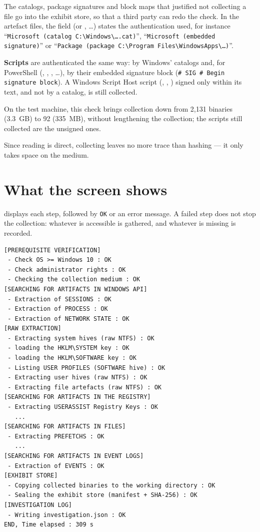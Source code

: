 \documentclass[11pt,a4paper,oneside]{report}
\begin{document}
The catalogs, package signatures and block maps that justified not collecting a
file go into the exhibit store, so that a third party can redo the check. In
the artefact files, the  field (or ,
\ldots) states the authentication used, for instance
``\texttt{Microsoft (catalog C:\textbackslash{}Windows\textbackslash{}\ldots.cat)}'',
``\texttt{Microsoft (embedded signature)}'' or
``\texttt{Package (package C:\textbackslash{}Program Files\textbackslash{}WindowsApps\textbackslash{}\ldots)}''.

\textbf{Scripts} are authenticated the same way: by Windows' catalogs and, for
PowerShell (, , ,
\ldots), by their embedded signature block
(\texttt{\# SIG \# Begin signature block}). A Windows Script Host script
(, , ) signed only within its text, and
not by a catalog, is still collected.

On the test machine, this check brings collection down from 2,131 binaries
(3.3~GB) to 92 (335~MB), without lengthening the collection; the scripts still
collected are the unsigned ones.

Since reading is direct, collecting leaves no more trace than hashing — it only
takes space on the medium.

\section{What the screen shows}

\wac{} displays each step, followed by \texttt{OK} or an error message. A failed
step does not stop the collection: whatever is accessible is gathered, and
whatever is missing is recorded.

\begin{lstlisting}
[PREREQUISITE VERIFICATION]
 - Check OS >= Windows 10 : OK
 - Check administrator rights : OK
 - Checking the collection medium : OK
[SEARCHING FOR ARTIFACTS IN WINDOWS API]
 - Extraction of SESSIONS : OK
 - Extraction of PROCESS : OK
 - Extraction of NETWORK STATE : OK
[RAW EXTRACTION]
 - Extracting system hives (raw NTFS) : OK
 - loading the HKLM\SYSTEM key : OK
 - loading the HKLM\SOFTWARE key : OK
 - Listing USER PROFILES (SOFTWARE hive) : OK
 - Extracting user hives (raw NTFS) : OK
 - Extracting file artefacts (raw NTFS) : OK
[SEARCHING FOR ARTIFACTS IN THE REGISTRY]
 - Extracting USERASSIST Registry Keys : OK
   ...
[SEARCHING FOR ARTIFACTS IN FILES]
 - Extracting PREFETCHS : OK
   ...
[SEARCHING FOR ARTIFACTS IN EVENT LOGS]
 - Extraction of EVENTS : OK
[EXHIBIT STORE]
 - Copying collected binaries to the working directory : OK
 - Sealing the exhibit store (manifest + SHA-256) : OK
[INVESTIGATION LOG]
 - Writing investigation.json : OK
END, Time elapsed : 309 s
\end{lstlisting}
\end{document}
